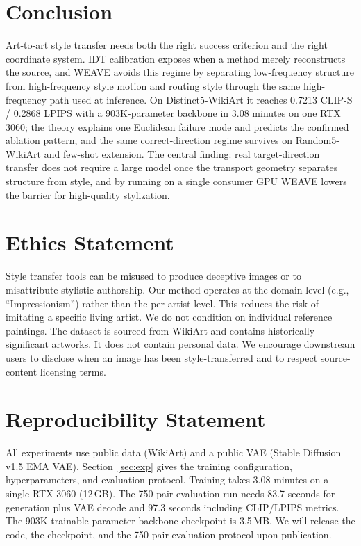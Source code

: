 \documentclass[letterpaper]{article}
\begin{document}
\section{Conclusion}

Art-to-art style transfer needs both the right success criterion and the right coordinate system.
IDT calibration exposes when a method merely reconstructs the source, and WEAVE avoids this regime by separating low-frequency structure from high-frequency style motion and routing style through the same high-frequency path used at inference.
On Distinct5-WikiArt it reaches 0.7213 CLIP-S / 0.2868 LPIPS with a 903K-parameter backbone in 3.08 minutes on one RTX 3060; the theory explains one Euclidean failure mode and predicts the confirmed ablation pattern, and the same correct-direction regime survives on Random5-WikiArt and few-shot extension.
The central finding: real target-direction transfer does not require a large model once the transport geometry separates structure from style, and by running on a single consumer GPU WEAVE lowers the barrier for high-quality stylization.

\section*{Ethics Statement}
Style transfer tools can be misused to produce deceptive images or to misattribute stylistic authorship.
Our method operates at the domain level (e.g., ``Impressionism'') rather than the per-artist level.
This reduces the risk of imitating a specific living artist.
We do not condition on individual reference paintings.
The dataset is sourced from WikiArt and contains historically significant artworks.
It does not contain personal data.
We encourage downstream users to disclose when an image has been style-transferred and to respect source-content licensing terms.

\section*{Reproducibility Statement}
All experiments use public data (WikiArt) and a public VAE (Stable Diffusion v1.5 EMA VAE).
Section~\ref{sec:exp} gives the training configuration, hyperparameters, and evaluation protocol.
Training takes 3.08 minutes on a single RTX 3060 (12\,GB).
The 750-pair evaluation run needs 83.7 seconds for generation plus VAE decode and 97.3 seconds including CLIP/LPIPS metrics.
The 903K trainable parameter backbone checkpoint is 3.5\,MB.
We will release the code, the checkpoint, and the 750-pair evaluation protocol upon publication.

\FloatBarrier


\end{document}
